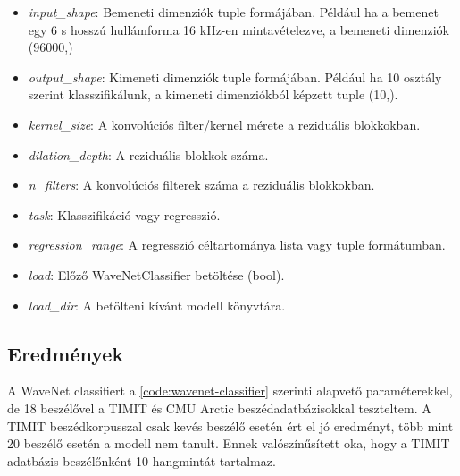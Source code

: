\begin{itemize}
	\item \emph{input\_shape}: Bemeneti dimenziók tuple formájában. Például ha a bemenet egy 6 s hosszú hullámforma 16 kHz-en mintavételezve, a bemeneti dimenziók (96000,)
	\item \emph{output\_shape}: Kimeneti dimenziók tuple formájában. Például ha 10 osztály szerint klasszifikálunk, a kimeneti dimenziókból képzett tuple (10,).
	\item \emph{kernel\_size}: A konvolúciós filter/kernel mérete a reziduális blokkokban.
	\item \emph{dilation\_depth}: A reziduális blokkok száma.
	\item \emph{n\_filters}: A konvolúciós filterek száma a reziduális blokkokban.
	\item \emph{task}: Klasszifikáció vagy regresszió.
	\item \emph{regression\_range}: A regresszió céltartománya lista vagy tuple formátumban.
	\item \emph{load}: Előző WaveNetClassifier betöltése (bool).
	\item \emph{load\_dir}: A betölteni kívánt modell könyvtára.
\end{itemize}

\subsection{Eredmények}

A WaveNet classifiert a \ref{code:wavenet-classifier} szerinti alapvető paraméterekkel, de 18 beszélővel a TIMIT és CMU Arctic beszédadatbázisokkal teszteltem. A TIMIT beszédkorpusszal csak kevés beszélő esetén ért el jó eredményt, több mint 20 beszélő esetén a modell nem tanult. Ennek valószínűsített oka, hogy a TIMIT adatbázis beszélőnként 10 hangmintát tartalmaz.

\setlength\arrayrulewidth{0.6pt}

